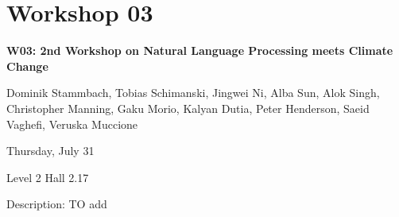 \clearpage



\section[W03: 2nd Workshop on Natural Language Processing meets Climate Change]{Workshop 03}

\begin{center}
    {\Large \textbf{W03: 2nd Workshop on Natural Language Processing meets Climate Change}}

    Dominik Stammbach, Tobias Schimanski, Jingwei Ni, Alba Sun, Alok Singh, Christopher Manning, Gaku Morio, Kalyan Dutia, Peter Henderson, Saeid Vaghefi, Veruska Muccione

    Thursday, July 31
    
    Level 2 Hall 2.17

\end{center}

Description: TO add


